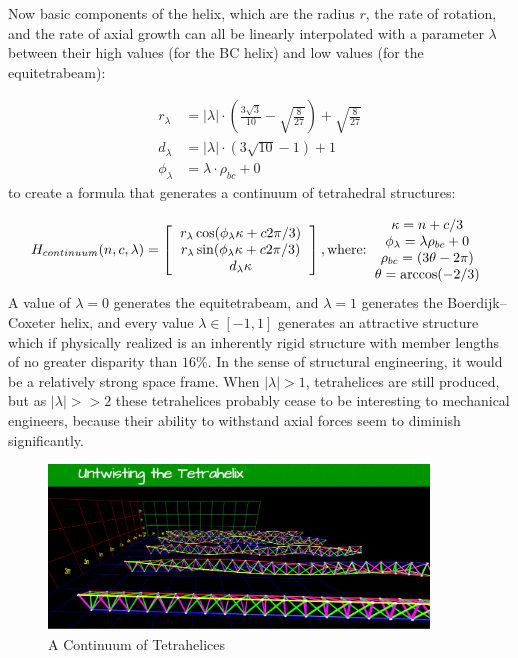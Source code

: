 \documentclass[11pt]{article}
\begin{document}
Now basic components of the helix, which are the radius $r$, the rate of rotation, and the rate of
axial growth can all be linearly interpolated with a parameter $\lambda$ between their high values (for the BC helix)
and low values (for the equitetrabeam):

\begin{align*}
r_{\lambda}  &=  \lvert \lambda \rvert \cdot (\frac{3 \sqrt{3}}{10}  - \sqrt{\frac{8}{27}}) + \sqrt{\frac{8}{27}}  \\
d_{\lambda} &=   \lvert \lambda \rvert \cdot (3 \sqrt{10} - 1) + 1 \\
\phi_{\lambda} &=  \lambda \cdot \rho_{bc}  + 0
\end{align*}
to create a formula that generates a continuum of tetrahedral structures:

\[
H_{continuum}(n,c,\lambda) =
\left [
  \begin{tabular}{c}
   $ r_{\lambda} \cos(\phi_{\lambda} \kappa + c 2 \pi /3) $\\
   $ r_{\lambda}  \sin(\phi_{\lambda} \kappa + c 2 \pi /3) $\\
   $ d_{\lambda} \kappa $
  \end{tabular}
  \right ],
\text{where:}
  \begin{tabular}{c}
    $\kappa = n + c/3$ \\
    $ \phi_{\lambda} =  \lambda \rho_{bc}  + 0 $\\
    $\rho_{bc} = (3 \theta - 2 \pi)$ \\
   $ \theta = \arccos(-2/3) $
  \end{tabular}      
\]
A value of $\lambda = 0$ generates the equitetrabeam, and $\lambda = 1$ generates the Boerdijk--Coxeter helix, and every
value $\lambda \in [-1,1]$ generates an attractive structure which if physically realized is an inherently rigid structure
with member lengths of no greater disparity than $16\%$.
In the sense of structural engineering, it would be a relatively strong space frame. When $\lvert \lambda \rvert > 1$, tetrahelices
are still produced, but as $\lvert \lambda \rvert >> 2$ these tetrahelices probably cease to be interesting to mechanical engineers,
because their ability to withstand axial forces seem to diminish significantly.

 \begin{figure}[H]
     \centering
     \includegraphics[width=0.9\textwidth]{figures/Continuum.png}
     \caption{A Continuum of Tetrahelices}
 \end{figure}
\end{document}
